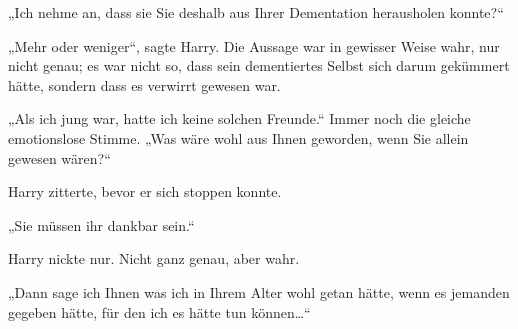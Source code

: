 „Ich nehme an, dass sie Sie deshalb aus Ihrer Dementation herausholen konnte?“

„Mehr oder weniger“, sagte Harry. Die Aussage war in gewisser Weise wahr, nur nicht genau; es war nicht so, dass sein dementiertes Selbst sich darum gekümmert hätte, sondern dass es verwirrt gewesen war.

„Als ich jung war, hatte ich keine solchen Freunde.“ Immer noch die gleiche emotionslose Stimme. „Was wäre wohl aus Ihnen geworden, wenn Sie allein gewesen wären?“

Harry zitterte, bevor er sich stoppen konnte.

„Sie müssen ihr dankbar sein.“

Harry nickte nur. Nicht ganz genau, aber wahr.

„Dann sage ich Ihnen was ich in Ihrem Alter wohl getan hätte, wenn es jemanden gegeben hätte, für den ich es hätte tun können…“

